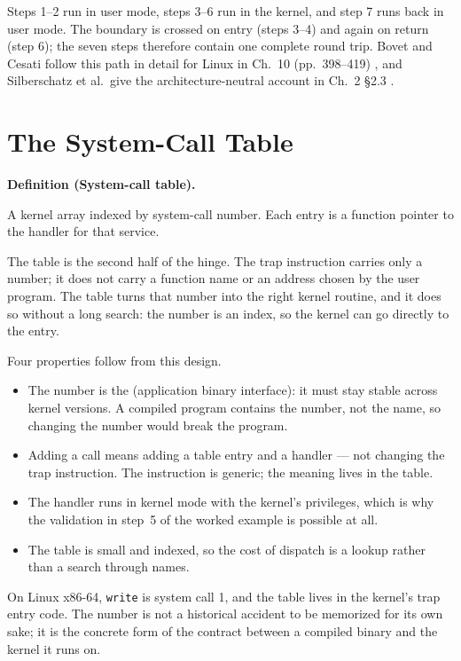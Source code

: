 \documentclass[11pt]{article}
\newenvironment{definitionbox}[1]{%
  \par\noindent\textbf{Definition (#1).}\ \itshape
}{\par\vspace{0.3em}}
\begin{document}
Steps 1--2 run in user mode, steps 3--6 run in the kernel, and step 7 runs back
in user mode. The boundary is crossed on entry (steps 3--4) and again on
return (step 6); the seven steps therefore contain one complete round trip. Bovet and
Cesati follow this path in detail for Linux in Ch.~10 (pp.~398--419)
\cite{BovetCesati_understanding_linux_kernel}, and Silberschatz et al.\ give
the architecture-neutral account in Ch.~2 \S2.3
\cite{SilberschatzOSC_operating_system_concepts}.

\section{The System-Call Table}

\begin{definitionbox}{System-call table}
A kernel array indexed by system-call number. Each entry is a function pointer
to the handler for that service.
\end{definitionbox}

The table is the second half of the hinge. The trap instruction carries only a
number; it does not carry a function name or an address chosen by the user
program. The table turns that number into the right kernel routine, and it does
so without a long search: the number is an index, so the kernel can go directly
to the entry.

Four properties follow from this design.

\begin{itemize}
  \item The number is the  (application binary interface): it must
        stay stable across kernel versions. A compiled program contains the
        number, not the name, so changing the number would break the program.
  \item Adding a call means adding a table entry and a handler --- not changing
        the trap instruction. The instruction is generic; the meaning lives in
        the table.
  \item The handler runs in kernel mode with the kernel's privileges, which is
        why the validation in step~5 of the worked example is possible at all.
  \item The table is small and indexed, so the cost of dispatch is a lookup
        rather than a search through names.
\end{itemize}

On Linux x86-64, \texttt{write} is system call 1, and the table lives in the
kernel's trap entry code. The number is not a historical accident to be
memorized for its own sake; it is the concrete form of the contract between a
compiled binary and the kernel it runs on.
\end{document}
